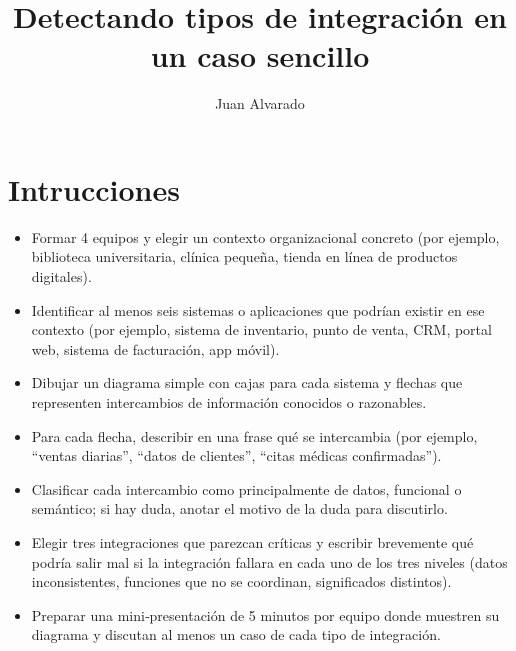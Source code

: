 \documentclass[11pt,a4paper]{article}
\title{Detectando tipos de integración en un caso sencillo}
\author{Juan Alvarado}
\date{}
\begin{document}
	
	\maketitle
	
	\section*{Intrucciones}
	
	
	\begin{itemize}
		\item Formar 4 equipos y elegir un contexto organizacional concreto (por ejemplo, biblioteca universitaria, clínica pequeña, tienda en línea de productos digitales).
	 	
		\item 	Identificar al menos seis sistemas o aplicaciones que podrían existir en ese contexto (por ejemplo, sistema de inventario, punto de venta, CRM, portal web, sistema de facturación, app móvil).
		 	
		\item 	Dibujar un diagrama simple con cajas para cada sistema y flechas que representen intercambios de información conocidos o razonables.
	 	
		\item 	Para cada flecha, describir en una frase qué se intercambia (por ejemplo, “ventas diarias”, “datos de clientes”, “citas médicas confirmadas”).
		 	
		\item 	Clasificar cada intercambio como principalmente de datos, funcional o semántico; si hay duda, anotar el motivo de la duda para discutirlo.
		 	
		\item 	Elegir tres integraciones que parezcan críticas y escribir brevemente qué podría salir mal si la integración fallara en cada uno de los tres niveles (datos inconsistentes, funciones que no se coordinan, significados distintos).
		 	
		\item 	Preparar una mini‑presentación de 5 minutos por equipo donde muestren su diagrama y discutan al menos un caso de cada tipo de integración.
	\end{itemize}
	
	
\end{document}
